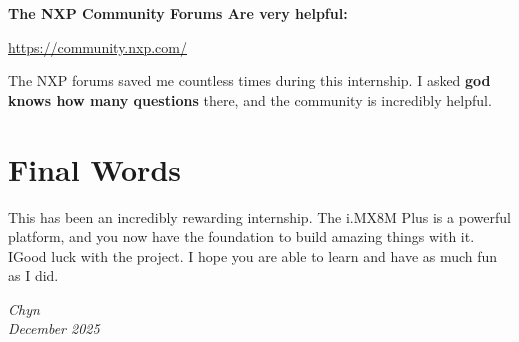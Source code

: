 \documentclass[12pt,a4paper]{report}
\begin{document}
\begin{important}
\textbf{The NXP Community Forums Are very helpful:}

\url{https://community.nxp.com/}

The NXP forums saved me countless times during this internship. I asked \textbf{god knows how many questions} there, and the community is incredibly helpful.

\end{important}


\section{Final Words}

This has been an incredibly rewarding internship. The i.MX8M Plus is a powerful platform, and you now have the foundation to build amazing things with it. IGood luck with the project. I hope you are able to learn and have as much fun as I did.

\vspace{0.5cm}

\begin{flushright}
\textit{Chyn}\\
\textit{December 2025}\\
\end{flushright}

\vspace{2cm}
\end{document}
